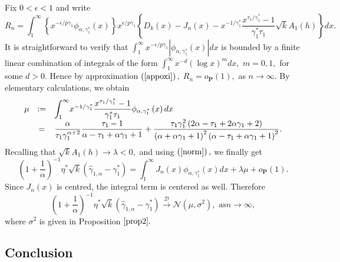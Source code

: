 \documentclass[reqno,openbib,runningheads,a4paper,12pt]{amsart}%
\begin{document}
\noindent Fix $0<\epsilon<1$ and write%
\[
R_{n}=\int_{1}^{\infty}\left\{  x^{-\epsilon/p\gamma_{1}}\phi_{\alpha
,\gamma_{1}^{\ast}}\left(  x\right)  \right\}  x^{\epsilon/p\gamma_{1}%
}\left\{  D_{k}\left(  x\right)  -J_{n}\left(  x\right)  -x^{-1/\gamma
_{1}^{\ast}}\frac{x^{\tau_{1}/\gamma_{1}^{\ast}}-1}{\gamma_{1}^{\ast}\tau_{1}%
}\sqrt{k}A_{1}\left(  h\right)  \right\}  dx.
\]
It is straightforward to verify that $\int_{1}^{\infty}x^{-\epsilon
/p\gamma_{1}}\left\vert \phi_{\alpha,\gamma_{1}^{\ast}}\left(  x\right)
\right\vert dx$ is bounded by a finite linear combination of integrals of the
form $\int_{1}^{\infty}x^{-d}\left(  \log x\right)  ^{m}dx,$ $m=0,1,$ for some
$d>0.$ Hence by approximation $\left(  \ref{appoxi}\right)  ,$\textbf{ }%
$R_{n}=o_{\mathbf{P}}\left(  1\right)  ,$\textbf{ }as $n\rightarrow\infty.$ By
elementary calculations, we obtain%
\begin{equation}%
\begin{array}
[c]{ccl}%
\mu & := &
{\displaystyle\int_{1}^{\infty}}
x^{-1/\gamma_{1}^{\ast}}\dfrac{x^{\tau_{1}/\gamma_{1}^{\ast}}-1}{\gamma
_{1}^{\ast}\tau_{1}}\phi_{\alpha,\gamma_{1}^{\ast}}\left(  x\right)  dx\\
& = & \dfrac{\alpha}{\tau_{1}\gamma_{1}^{\alpha+2}}\dfrac{\tau_{1}-1}%
{\alpha-\tau_{1}+\alpha\gamma_{1}+1}+\dfrac{\tau_{1}\gamma_{1}^{2}\left(
2\alpha-\tau_{1}+2\alpha\gamma_{1}+2\right)  }{\left(  \alpha+\alpha\gamma
_{1}+1\right)  ^{2}\left(  \alpha-\tau_{1}+\alpha\gamma_{1}+1\right)  ^{2}}.
\end{array}
\label{mu}%
\end{equation}
Recalling that\textbf{ }$\sqrt{k}A_{1}\left(  h\right)  \rightarrow\lambda<0,$
and using $\left(  \ref{norm}\right)  ,$ we finally get
\[
\left(  1+\frac{1}{\alpha}\right)  ^{-1}\eta^{\ast}\sqrt{k}\left(
\widehat{\gamma}_{1,\alpha}-\gamma_{1}^{\ast}\right)  =\int_{1}^{\infty}%
J_{n}\left(  x\right)  \phi_{\alpha,\gamma_{1}^{\ast}}\left(  x\right)
dx+\lambda\mu+o_{\mathbf{P}}\left(  1\right)  .
\]
Since $J_{n}\left(  x\right)  $ is centred, the integral term is centered as
well. Therefore%
\[
\left(  1+\frac{1}{\alpha}\right)  ^{-1}\eta^{\ast}\sqrt{k}\left(
\widehat{\gamma}_{1,\alpha}-\gamma_{1}^{\ast}\right)  \overset{\mathcal{D}%
}{\rightarrow}\mathcal{N}\left(  \mu,\sigma^{2}\right)  ,\text{ as
}n\rightarrow\infty,
\]
where $\sigma^{2}$ is given in Proposition $\ref{prop2}.$

\subsection{Conclusion}
\end{document}
